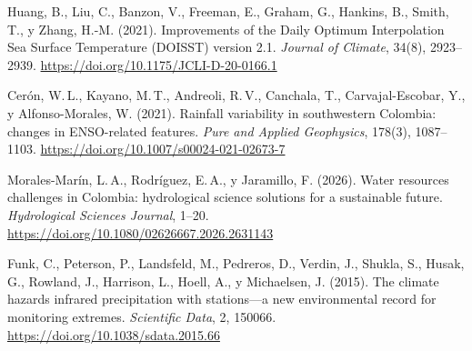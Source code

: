 \documentclass[12pt, letterpaper]{article}
\begin{document}
	\noindent [20] Huang, B., Liu, C., Banzon, V., Freeman, E., Graham, G., Hankins, B., Smith,
	T., y Zhang, H.-M. (2021). Improvements of the Daily Optimum Interpolation Sea Surface
	Temperature (DOISST) version 2.1. \textit{Journal of Climate}, 34(8), 2923--2939.
	\url{https://doi.org/10.1175/JCLI-D-20-0166.1}
	
	\noindent [21] Cer\'on, W.\,L., Kayano, M.\,T., Andreoli, R.\,V., Canchala, T.,
	Carvajal-Escobar, Y., y Alfonso-Morales, W. (2021). Rainfall variability in
	southwestern Colombia: changes in ENSO-related features.
	\textit{Pure and Applied Geophysics}, 178(3), 1087--1103.
	\url{https://doi.org/10.1007/s00024-021-02673-7}
	
	\noindent [22] Morales-Mar\'in, L.\,A., Rodr\'iguez, E.\,A., y Jaramillo, F. (2026).
	Water resources challenges in Colombia: hydrological science solutions for a
	sustainable future. \textit{Hydrological Sciences Journal}, 1--20.
	\url{https://doi.org/10.1080/02626667.2026.2631143}
	
	\noindent [23] Funk, C., Peterson, P., Landsfeld, M., Pedreros, D., Verdin, J., Shukla, S.,
	Husak, G., Rowland, J., Harrison, L., Hoell, A., y Michaelsen, J. (2015). The climate
	hazards infrared precipitation with stations---a new environmental record for monitoring
	extremes. \textit{Scientific Data}, 2, 150066.
	\url{https://doi.org/10.1038/sdata.2015.66}
	
\end{document}
